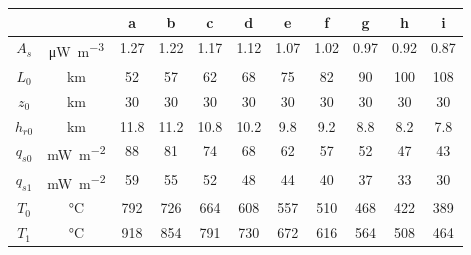 \begin{tabular}{ccccccccccc}
\toprule
& & a & b & c & d & e & f & g & h & i \\
\midrule
$A_{s}$ & \si{\uW\per\m\cubed} & 1.27 & 1.22 & 1.17 & 1.12 & 1.07 & 1.02 & 0.97 & 0.92 & 0.87 \\
$L_{0}$ & \si{\km} & 52 & 57 & 62 & 68 & 75 & 82 & 90 & 100 & 108 \\
$z_{0}$ & \si{\km} & 30 & 30 & 30 & 30 & 30 & 30 & 30 & 30 & 30 \\
$h_{r0}$ & \si{\km} & 11.8 & 11.2 & 10.8 & 10.2 & 9.8 & 9.2 & 8.8 & 8.2 & 7.8 \\
\midrule
$q_{s0}$ & \si{\mW\per\m\squared} & 88 & 81 & 74 & 68 & 62 & 57 & 52 & 47 & 43 \\
$q_{s1}$ & \si{\mW\per\m\squared} & 59 & 55 & 52 & 48 & 44 & 40 & 37 & 33 & 30 \\
$T_{0}$ & \si{\degreeCelsius} & 792 & 726 & 664 & 608 & 557 & 510 & 468 & 422 & 389 \\
$T_{1}$ & \si{\degreeCelsius} & 918 & 854 & 791 & 730 & 672 & 616 & 564 & 508 & 464 \\
\bottomrule
\end{tabular}
